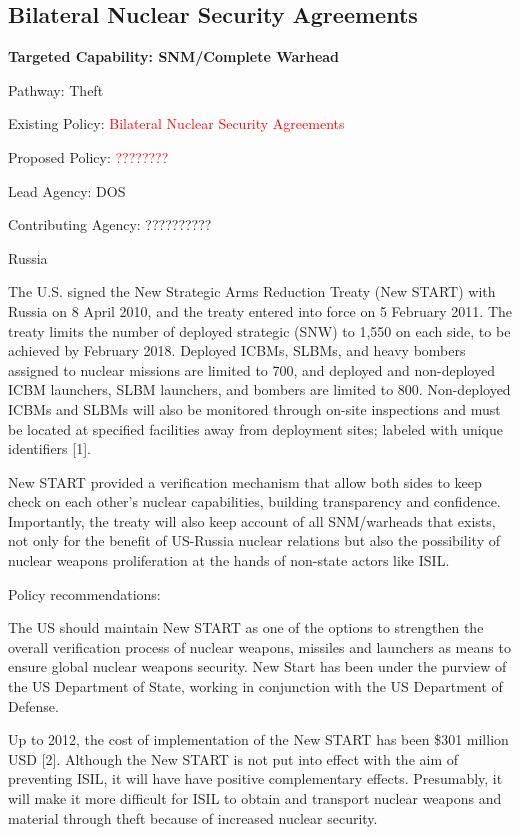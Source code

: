 \documentclass{report}
\begin{document}
\subsection{Bilateral Nuclear Security Agreements}



\bfseries Targeted Capability: SNM/Complete Warhead

Pathway: Theft

Existing Policy:  \textcolor{red}{Bilateral Nuclear Security Agreements}

Proposed Policy:  \textcolor{red}{????????}

Lead Agency: DOS


Contributing Agency: ??????????  \normalfont


Russia

The U.S. signed the New Strategic Arms Reduction Treaty (New START) with Russia on 8 April 2010, and the treaty entered into force on 5 February 2011. The treaty limits the number of deployed strategic (SNW) to 1,550 on each side, to be achieved by February 2018. Deployed ICBMs, SLBMs, and heavy bombers assigned to nuclear missions are limited to 700, and deployed and non-deployed ICBM launchers, SLBM launchers, and bombers are limited to 800. Non-deployed ICBMs and SLBMs will also be monitored through on-site inspections and must be located at specified facilities away from deployment sites; labeled with unique identifiers [1]. 

New START provided a verification mechanism that allow both sides to keep check on each other's nuclear capabilities, building transparency and confidence. Importantly, the treaty will also keep account of all SNM/warheads that exists, not only for the benefit of US-Russia nuclear relations but also the possibility of nuclear weapons proliferation at the hands of non-state actors like ISIL.

Policy recommendations:

The US should maintain New START as one of the options to strengthen the overall verification process of nuclear weapons, missiles and launchers as means to ensure global nuclear weapons security. New Start has been under the purview of the US Department of State, working in conjunction with the US Department of Defense.

Up to 2012,  the cost of implementation of the New START has been \$301 million USD [2]. Although the New START is not put into effect with the aim of preventing ISIL, it will have have positive complementary effects. Presumably, it will make it more difficult for ISIL to obtain and transport nuclear weapons and material through theft because of increased nuclear security. 
\end{document}
